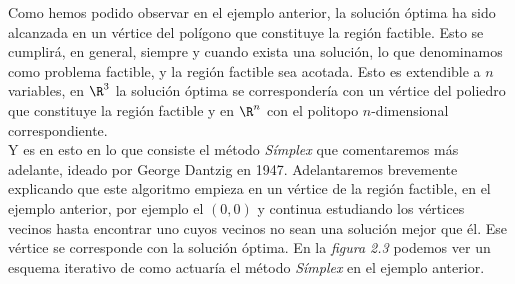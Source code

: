 Como hemos podido observar en el ejemplo anterior, la solución óptima ha sido alcanzada en un vértice del polígono que constituye la región factible. Esto se cumplirá, en general, siempre y cuando exista una solución, lo que denominamos como problema factible, y la región factible sea acotada. Esto es extendible a $n$ variables, en $\R^3$ la solución óptima se correspondería con un vértice del poliedro que constituye la región factible y en $\R^n$ con el politopo $n$-dimensional correspondiente.\\

Y es en esto en lo que consiste el método \textit{Símplex} que comentaremos más adelante, ideado por George Dantzig en 1947. Adelantaremos brevemente explicando que este algoritmo empieza en un vértice de la región factible, en el ejemplo anterior, por ejemplo el $(0,0)$ y continua estudiando los vértices vecinos hasta encontrar uno cuyos vecinos no sean una solución mejor que él. Ese vértice se corresponde con la solución óptima. En la \textit{figura 2.3} podemos ver un esquema iterativo de como actuaría el método \textit{Símplex} en el ejemplo anterior.
\begin{figura}\ \begin{center} \end{center} \end{figura}

